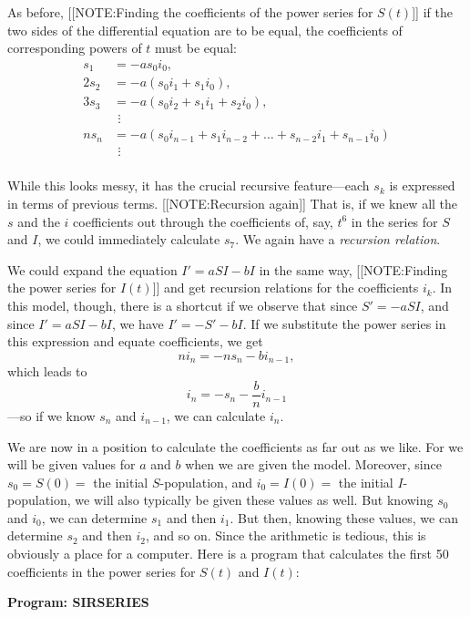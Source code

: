 As before, 
[[NOTE:Finding the coefficients of the power series  for $S(t)$]]
if the two sides of the differential equation are to be equal, the
coefficients of corresponding powers of $t$ must be equal:
\begin{align*}
s_1  &= -as_0i_0, \\
2s_2 &= -a(s_0i_1+s_1i_0), \\
3s_3 &= -a(s_0i_2+s_1i_1+s_2i_0), \\[-5pt]
&\ \, \vdots \\[-5pt]
ns_n &= -a(s_0i_{n-1}+s_1i_{n-2}+ \ldots +s_{n-2}i_1+s_{n-1}i_0) \\[-5pt]
&\ \, \vdots \\[-5pt]
\end{align*}




While this looks messy, it has the crucial recursive feature---each
$s_k$ is expressed in terms of previous terms.
[[NOTE:Recursion again]]
That is, if we knew all the $s$ and the $i$ coefficients out through
the coefficients of, say, $t^6$ in the series for $S$ and $I$, we
could immediately calculate $s_7$.  We again have a {\em recursion
  relation}.

We could expand the equation $I'= aSI - bI$ in the same way,
[[NOTE:Finding the  power series  for $I(t)$]]
and get recursion relations for the coefficients $i_k$.  In this
model, though, there is a shortcut if we observe that since $S'=
-aSI$, and since $I'= aSI - bI$, we have $I' = -S' -bI$. If we
substitute the power series in this expression and equate
coefficients, we get
\[
ni_n = -ns_n - bi_{n-1},
\]
which leads to
\[
i_n = -s_n-\frac{b}{n}i_{n-1}
\]
---so if we know $s_n$ and $i_{n-1}$, we can calculate $i_n$.

We are now in a position to calculate the coefficients as far out as
we like.  For we will be given values for $a$ and $b$ when we are
given the model.  Moreover, since $s_0=S(0) = $ the initial
$S$-population, and $i_0=I(0)=$ the initial $I$-population, we will
also typically be given these values as well.  But knowing $s_0$ and
$i_0$, we can determine $s_1$ and then $i_1$.  But then, knowing these
values, we can determine $s_2$ and then $i_2$, and so on.  Since the
arithmetic is tedious, this is obviously a place for a computer.  Here
is a program that calculates the first 50 coefficients in the power
series for $S(t)$ and $I(t)$:

\begin{center}

{\bf Program: SIRSERIES}
\end{center}


